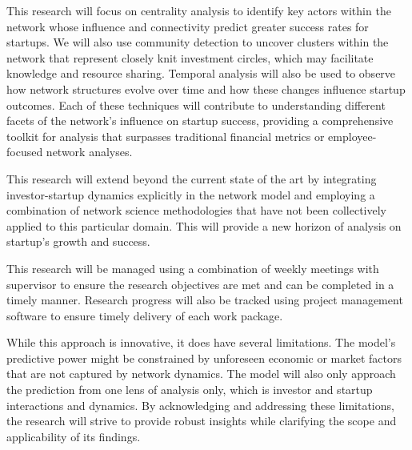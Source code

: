 \documentclass[a4paper,11pt]{article}
\begin{document}
This research will focus on centrality analysis to identify key actors within the network whose influence and connectivity predict greater success rates for startups. We will also use community detection to uncover clusters within the network that represent closely knit investment circles, which may facilitate knowledge and resource sharing. Temporal analysis will also be used to observe how network structures evolve over time and how these changes influence startup outcomes. Each of these techniques will contribute to understanding different facets of the network's influence on startup success, providing a comprehensive toolkit for analysis that surpasses traditional financial metrics or employee-focused network analyses.

This research will extend beyond the current state of the art by integrating investor-startup dynamics explicitly in the network model and employing a combination of network science methodologies that have not been collectively applied to this particular domain. This will provide a new horizon of analysis on startup's growth and success.

This research will be managed using a combination of weekly meetings with supervisor to ensure the research objectives are met and can be completed in a timely manner. Research progress will also be tracked using project management software to ensure timely delivery of each work package.

While this approach is innovative, it does have several limitations.
The model’s predictive power might be constrained by unforeseen economic or market factors that are not captured by network dynamics. The model will also only approach the prediction from one lens of analysis only, which is investor and startup interactions and dynamics. By acknowledging and addressing these limitations, the research will strive to provide robust insights while clarifying the scope and applicability of its findings.
\end{document}
